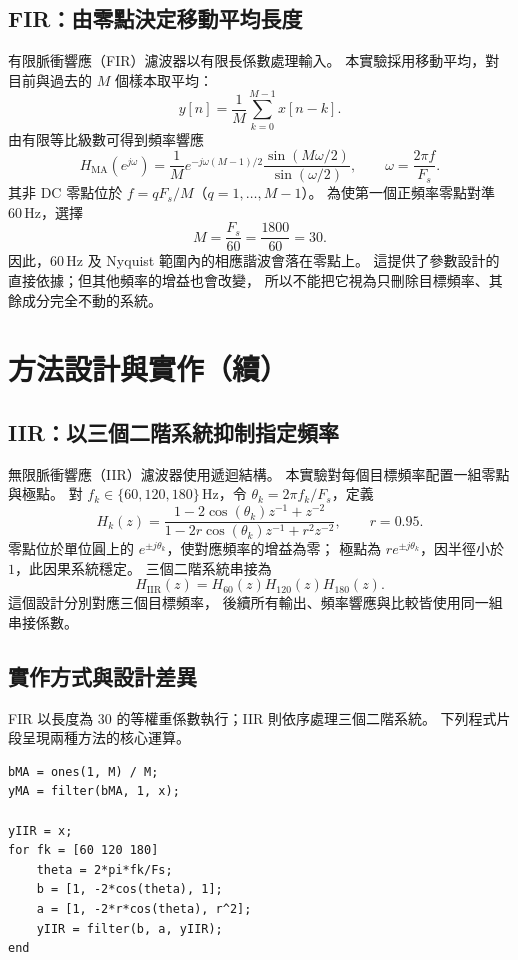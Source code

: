 \documentclass[11pt,a4paper,fontset=none,scheme=plain]{ctexart}
\newcommand{\Hz}{\,\mathrm{Hz}}
\begin{document}
\subsection{FIR：由零點決定移動平均長度}
有限脈衝響應（FIR）濾波器以有限長係數處理輸入。
本實驗採用移動平均，對目前與過去的 $M$ 個樣本取平均：
\begin{equation}
y[n]=\frac{1}{M}\sum_{k=0}^{M-1}x[n-k].
\end{equation}
由有限等比級數可得到頻率響應
\begin{equation}
H_{\mathrm{MA}}(e^{j\omega})
=\frac{1}{M}e^{-j\omega(M-1)/2}
\frac{\sin(M\omega/2)}{\sin(\omega/2)},
\qquad \omega=\frac{2\pi f}{F_s}.
\label{eq:ma}
\end{equation}
其非 DC 零點位於 $f=qF_s/M$（$q=1,\ldots,M-1$）。
為使第一個正頻率零點對準 $60\Hz$，選擇
\[
\boxed{M=\frac{F_s}{60}=\frac{1800}{60}=30.}
\]
因此，$60\Hz$ 及 Nyquist 範圍內的相應諧波會落在零點上。
這提供了參數設計的直接依據；但其他頻率的增益也會改變，
所以不能把它視為只刪除目標頻率、其餘成分完全不動的系統。

\clearpage
\section*{方法設計與實作（續）}
\subsection{IIR：以三個二階系統抑制指定頻率}
無限脈衝響應（IIR）濾波器使用遞迴結構。
本實驗對每個目標頻率配置一組零點與極點。
對 $f_k\in\{60,120,180\}\Hz$，令 $\theta_k=2\pi f_k/F_s$，定義
\begin{equation}
H_k(z)=
\frac{1-2\cos(\theta_k)z^{-1}+z^{-2}}
     {1-2r\cos(\theta_k)z^{-1}+r^2z^{-2}},
\qquad r=0.95.
\label{eq:notch}
\end{equation}
零點位於單位圓上的 $e^{\pm j\theta_k}$，使對應頻率的增益為零；
極點為 $re^{\pm j\theta_k}$，因半徑小於 $1$，此因果系統穩定。
三個二階系統串接為
\begin{equation}
H_{\mathrm{IIR}}(z)=H_{60}(z)H_{120}(z)H_{180}(z).
\end{equation}
這個設計分別對應三個目標頻率，
後續所有輸出、頻率響應與比較皆使用同一組串接係數。

\subsection{實作方式與設計差異}
FIR 以長度為 $30$ 的等權重係數執行；IIR 則依序處理三個二階系統。
下列程式片段呈現兩種方法的核心運算。
\begin{lstlisting}
bMA = ones(1, M) / M;
yMA = filter(bMA, 1, x);

yIIR = x;
for fk = [60 120 180]
    theta = 2*pi*fk/Fs;
    b = [1, -2*cos(theta), 1];
    a = [1, -2*r*cos(theta), r^2];
    yIIR = filter(b, a, yIIR);
end
\end{lstlisting}
\end{document}
